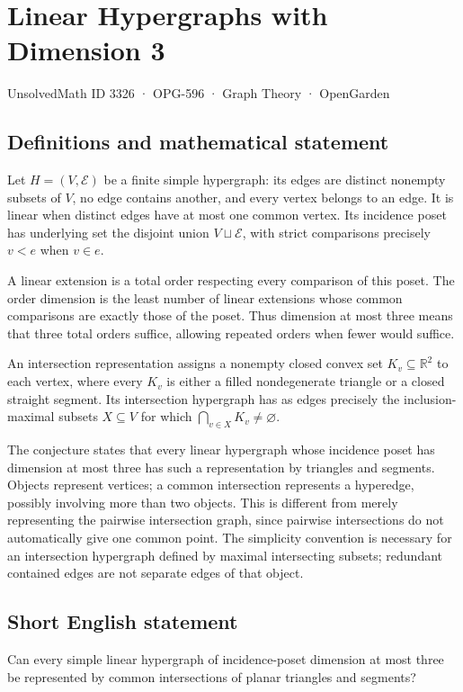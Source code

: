\documentclass[11pt,a4paper]{article}
\begin{document}
\section*{Linear Hypergraphs with Dimension 3}\label{3326}
{\small UnsolvedMath ID 3326 · OPG-596 · Graph Theory · OpenGarden}
\subsection{Definitions and mathematical statement}
Let $H=(V,\mathcal E)$ be a finite simple hypergraph: its edges are distinct nonempty subsets of $V$, no edge contains another, and every vertex belongs to an edge. It is linear when distinct edges have at most one common vertex. Its incidence poset has underlying set the disjoint union $V\sqcup\mathcal E$, with strict comparisons precisely $v<e$ when $v\in e$.

A linear extension is a total order respecting every comparison of this poset. The order dimension is the least number of linear extensions whose common comparisons are exactly those of the poset. Thus dimension at most three means that three total orders suffice, allowing repeated orders when fewer would suffice.

An intersection representation assigns a nonempty closed convex set $K_v\subseteq\mathbb R^2$ to each vertex, where every $K_v$ is either a filled nondegenerate triangle or a closed straight segment. Its intersection hypergraph has as edges precisely the inclusion-maximal subsets $X\subseteq V$ for which $\bigcap_{v\in X}K_v\ne\varnothing$.

The conjecture states that every linear hypergraph whose incidence poset has dimension at most three has such a representation by triangles and segments. Objects represent vertices; a common intersection represents a hyperedge, possibly involving more than two objects. This is different from merely representing the pairwise intersection graph, since pairwise intersections do not automatically give one common point. The simplicity convention is necessary for an intersection hypergraph defined by maximal intersecting subsets; redundant contained edges are not separate edges of that object.
\subsection{Short English statement}
Can every simple linear hypergraph of incidence-poset dimension at most three be represented by common intersections of planar triangles and segments?
\end{document}
